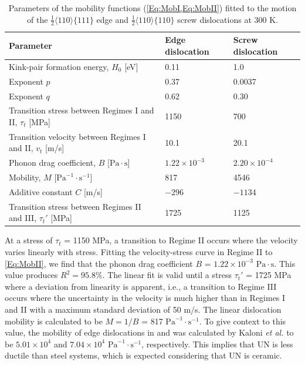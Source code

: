 \documentclass[applsci,article,submit,pdftex,moreauthors]{Definitions/mdpi}
\newcommand{\?}{\stackrel{?}{=}}
\providecommand{\DIFadd}[1]{{\bf #1}} %
\providecommand{\DIFdel}[1]{} %
\providecommand{\DIFaddbegin}{\protect\color{blue}} %
\providecommand{\DIFaddend}{\protect\color{black}} %
\providecommand{\DIFdelbegin}{\protect\color{red}} %
\providecommand{\DIFdelend}{\protect\color{black}} %
\newcommand{\DIFscaledelfig}{0.5}
\newlength{\DIFdelgraphicswidth} %
\newlength{\DIFdelgraphicsheight} %
\newcommand{\DIFaddincludegraphics}[2][]{{\color{blue}\fbox{\DIFOincludegraphics[#1]{#2}}}} %
\newcommand{\DIFdelincludegraphics}[2][]{%
\sbox{\DIFdelgraphicsbox}{\DIFOincludegraphics[#1]{#2}}%
\settoboxwidth{\DIFdelgraphicswidth}{\DIFdelgraphicsbox} %
\settoboxtotalheight{\DIFdelgraphicsheight}{\DIFdelgraphicsbox} %
\scalebox{\DIFscaledelfig}{%
\parbox[b]{\DIFdelgraphicswidth}{\usebox{\DIFdelgraphicsbox}\\[-\baselineskip] \rule{\DIFdelgraphicswidth}{0em}}\llap{\resizebox{\DIFdelgraphicswidth}{\DIFdelgraphicsheight}{%
\setlength{\unitlength}{\DIFdelgraphicswidth}%
\begin{picture}(1,1)%
\thicklines\linethickness{2pt} %
{\color[rgb]{1,0,0}\put(0,0){\framebox(1,1){}}}%
{\color[rgb]{1,0,0}\put(0,0){\line( 1,1){1}}}%
{\color[rgb]{1,0,0}\put(0,1){\line(1,-1){1}}}%
\end{picture}%
}\hspace*{3pt}}} %
} %
\DeclareRobustCommand{\DIFaddbegin}{\DIFOaddbegin \let\includegraphics\DIFaddincludegraphics} %
\DeclareRobustCommand{\DIFaddend}{\DIFOaddend \let\includegraphics\DIFOincludegraphics} %
\DeclareRobustCommand{\DIFdelbegin}{\DIFOdelbegin \let\includegraphics\DIFdelincludegraphics} %
\DeclareRobustCommand{\DIFdelend}{\DIFOaddend \let\includegraphics\DIFOincludegraphics} %
\begin{document}
\begin{table}[h!]
\centering
\caption{Parameters of the mobility functions (\cref{Eq:MobI,Eq:MobII}) fitted to the motion of the $\frac{1}{2}\langle110\rangle\{111\}$ edge and $\frac{1}{2}\langle110\rangle\{110\}$ screw dislocations at 300 K.}
\footnotesize
\begin{tabular}{lll}
\hline
Parameter & Edge dislocation & Screw dislocation \\
\hline
Kink-pair formation energy, $H_0$ [eV] & 0.11 & 1.0 \\
Exponent $p$ & 0.37 & 0.0037 \\
Exponent $q$ & 0.62 & 0.30 \\
Transition stress between Regimes I and II, $\tau_t$ [MPa] & 1150 & 700 \\
Transition velocity between Regimes I and II, $v_t$ [m/s] & 10.1 & 20.1 \\
Phonon drag coefficient, $B$ [$\mathrm{Pa} \! \cdot \! \mathrm{s}$] & $1.22 \times 10^{-3}$ & $2.20 \times 10^{-4}$ \\ 
Mobility, $M$ [$\mathrm{Pa}^{-1} \! \cdot \! \mathrm{s}^{-1}$] & 817 & 4546 \\
Additive constant $C$ [m/s] & $-296$ & $-1134$ \\
Transition stress between Regimes II and III, $\tau_t'$ [MPa] & 1725 & 1125 \\
\hline
\end{tabular}
\label{Tab:DislocParams}
\end{table}

At a stress of $\tau_t$ = 1150 MPa, a transition to Regime II occurs where the velocity varies linearly with stress. Fitting the velocity-stress curve in Regime II to \cref{Eq:MobII}, we find that the phonon drag coefficient $B$ = $1.22 \times 10^{-3}$ $\mathrm{Pa} \! \cdot \! \mathrm{s}$. This value produces $R^2 = 95.8\%$. The linear fit is valid until a stress $\tau_t'$ = 1725 MPa where a deviation from linearity is apparent, i.e., a transition to Regime III occurs where the uncertainty in the velocity is much higher than in Regimes I and II with a maximum standard deviation of 50 m/s. The linear dislocation mobility is calculated to be $M = 1/B$ = 817 $\mathrm{Pa}^{-1} \! \cdot \! \mathrm{s}^{-1}$. To give context to this value, the mobility of edge dislocations in \DIFaddbegin \DIFadd{two iron-chromium-nickel steel systems (i.e., }\DIFaddend {} and \DIFdelbegin \DIFdel{steel systems }\DIFdelend \DIFaddbegin \DIFadd{) }\DIFaddend was calculated by Kaloni \textit{et al.} \cite{Kaloni2023} to be $5.01 \times 10^4$ and $7.04 \times 10^4$ $\mathrm{Pa}^{-1} \! \cdot \! \mathrm{s}^{-1}$, respectively. This implies that UN is less ductile than steel systems, which is expected considering that UN is ceramic.
\end{document}
